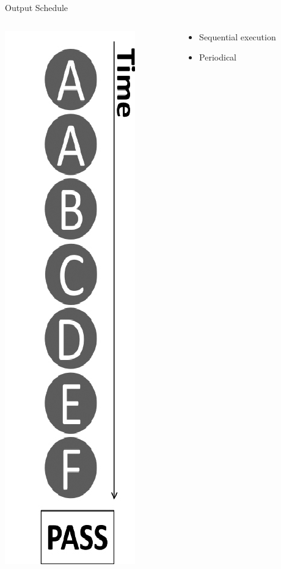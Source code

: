 \documentclass{beamer}
\begin{document}
\begin{frame}{Output Schedule}
  \begin{columns}
    \begin{column}{0.4\textwidth}
      \begin{center}
        \includegraphics[height=0.85\textheight]{fig1_2}
      \end{center}
    \end{column}
    \begin{column}{0.6\textwidth}
      \begin{itemize}
        \item Sequential execution
        \item Periodical
      \end{itemize}
    \end{column}
  \end{columns}
\end{frame}
\end{document}
